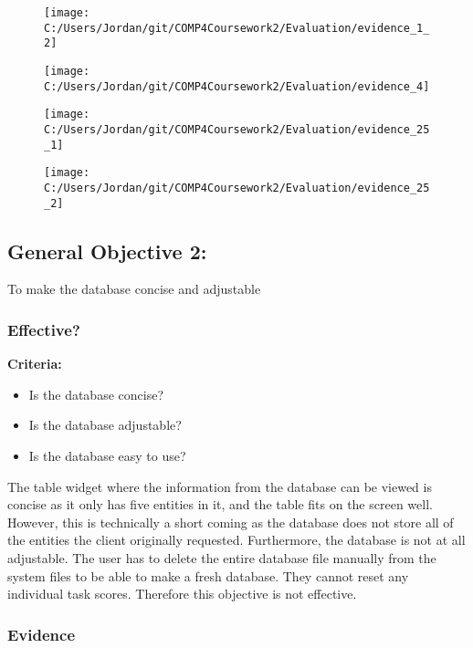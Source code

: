 \begin{figure}[H]
	\texttt{[image: C:/Users/Jordan/git/COMP4Coursework2/Evaluation/evidence\_1\_2]}
\end{figure}

\begin{figure}[H]
	\texttt{[image: C:/Users/Jordan/git/COMP4Coursework2/Evaluation/evidence\_4]}
\end{figure}

\begin{figure}[H]
	\texttt{[image: C:/Users/Jordan/git/COMP4Coursework2/Evaluation/evidence\_25\_1]}
\end{figure}

\begin{figure}[H]
	\texttt{[image: C:/Users/Jordan/git/COMP4Coursework2/Evaluation/evidence\_25\_2]}
\end{figure}

\subsection{General Objective 2: }

To make the database concise and adjustable

\subsubsection{Effective?}

\textbf{Criteria: }

\begin{itemize}
	\item Is the database concise?
	\item Is the database adjustable?
	\item Is the database easy to use?
\end{itemize}

The table widget where the information from the database can be viewed is concise as it only has five entities in it, and the table fits on the screen well. However, this is technically a short coming as the database does not store all of the entities the client originally requested. Furthermore, the database is not at all adjustable. The user has to delete the entire database file manually from the system files to be able to make a fresh database. They cannot reset any individual task scores. Therefore this objective is not effective.

\subsubsection{Evidence}

